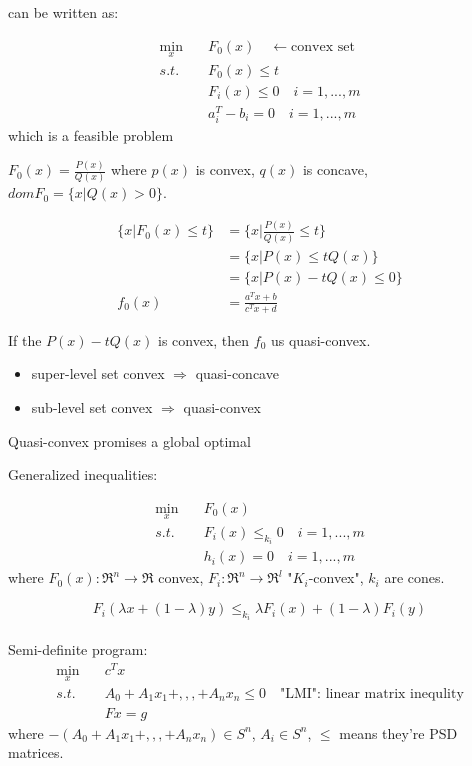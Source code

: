 can be written as:


\begin{align*}
\min_x\quad & F_0(x) \quad \leftarrow \text{convex set}\\
s.t.\quad  & F_0(x) \leq t  \\
& F_i(x) \leq 0 \quad i = 1,...,m \\
& a_i^T - b_i = 0\quad i = 1,...,m
\end{align*}
which is a feasible problem

\begin{example}
	$F_0(x) = \frac{P(x)}{Q(x)}$ where $p(x)$ is convex, $q(x)$ is concave, $domF_0 = \{x\vert Q(x) >0 \}$.
	
	\begin{align*}
	\{x\vert F_0(x) \leq t \} &= \{x\vert \frac{P(x)}{Q(x)}\leq t \}\\
	&= \{x\vert P(x)\leq tQ(x) \}\\
	&= \{x\vert P(x) - tQ(x)\leq 0 \}\\
	f_0(x) &= \frac{a^Tx + b}{c^Tx+d}
	\end{align*}
	
	If the $P(x) - tQ(x)$ is convex, then $f_0$ us quasi-convex.
	
	\begin{itemize}
		\item super-level set convex $\Rightarrow$ quasi-concave
		
		\item sub-level set convex $\Rightarrow$ quasi-convex
	\end{itemize}
	
	Quasi-convex promises a global optimal
\end{example}

Generalized inequalities:

\begin{align*}
\min_x\quad & F_0(x) \\
s.t.\quad & F_i(x) \leq_{k_i} 0 \quad i = 1,...,m\\
& h_i(x) = 0\quad i = 1,...,m 
\end{align*}
where $F_0(x): \Re^n\rightarrow \Re$ convex, $F_i: \Re^n\rightarrow \Re^l$ "$K_i$-convex", $k_i$ are cones.

\begin{equation*}
	F_i(\lambda x + (1-\lambda)y)\leq_{k_i} \lambda F_i(x) + (1-\lambda)F_i(y)
\end{equation*}\\

Semi-definite program:
\begin{align*}
\min_x\quad & c^Tx \\
s.t.\quad & A_0+A_1x_1+,,,+A_nx_n\leq 0\quad \text{"LMI": linear matrix inequlity}\\
& Fx = g
\end{align*}
where $-(A_0+A_1x_1+,,,+A_nx_n)\in S^n$, $A_i\in S^n$, $\leq$ means they're PSD matrices.


